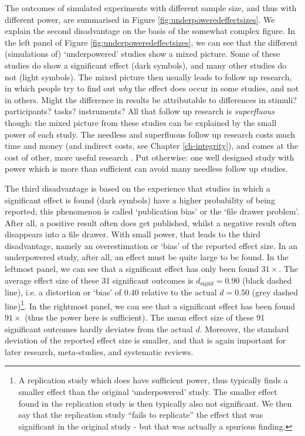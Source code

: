 \documentclass[
]{book}
\begin{document}
The outcomes of simulated experiments with different
sample size, and thus with different power, are summarised
in Figure \ref{fig:underpoweredeffectsizes}. We explain the second disadvantage on the basis of
the somewhat complex figure. In the left panel of Figure
\ref{fig:underpoweredeffectsizes}, we can see that the different
(simulations of) `underpowered' studies show a mixed
picture. Some of these studies do show a significant effect (dark symbols),
and many other studies do not (light symbols).
The mixed picture then usually leads to follow up research, in which
people try to find out \emph{why} the effect does occur in some studies,
and not in others. Might the difference in results be attributable
to differences in stimuli? participants? tasks?
instruments? All that follow up research is \emph{superfluous} though: the mixed
picture from these studies can be explained by the small
power of each study. The needless and superfluous follow up research
costs much time and money (and indirect costs,
see Chapter \ref{ch-integrity}), and comes at the cost of other, more useful
research \citep[p.118]{Schm96}. Put otherwise: one well designed study
with power which is more than sufficient can avoid many needless follow up studies.

The third disadvantage is based on the experience that studies in which
a significant effect is found (dark symbols) have a higher probability
of being reported; this phenomenon is called
`publication bias' or the `file drawer problem'. After all, a positive result
often does get published, whilst a negative result often disappears
into a file drawer. With small power, that leads to the third disadvantage,
namely an overestimation or `bias' of the reported effect size.
In an underpowered study, after all, an effect
must be quite large to be found. In the leftmost panel, we can see that
a significant effect has only been found \(31\times\). The average effect size of these
31 significant outcomes is \(\overline{d_{\textrm{signif}}}=0.90\) (black dashed line), i.e.
a distortion or `bias' of \(0.40\) relative to the actual
\(d=0.50\) (grey dashed line)\footnote{A replication study which does have sufficient power, thus typically finds a smaller effect than the
  original `underpowered' study. The smaller effect found in the replication study is then typically also not
  significant. We then say that the replication study ``fails to replicate'' the effect that was significant in
  the original study - but that was actually a spurious finding.}. In the rightmost panel, we can see that
a significant effect has been found \(91\times\) (thus the power here is sufficient).
The mean effect size of these 91 significant outcomes hardly deviates
from the actual \(d\). Moreover, the standard deviation of the reported
effect size is smaller, and that is again important for later research, meta-studies,
and systematic reviews.
\end{document}
